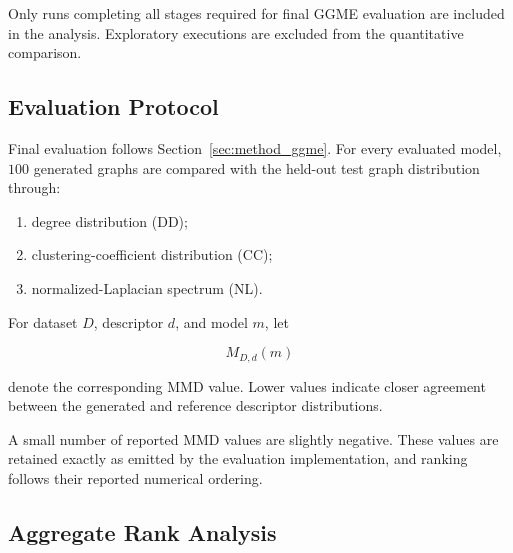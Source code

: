 Only runs completing all stages required for final GGME evaluation are included in the analysis. Exploratory executions are excluded from the quantitative comparison.




\subsection{Evaluation Protocol}
\label{subsec:exp_evaluation}

Final evaluation follows Section~\ref{sec:method_ggme}. For every evaluated model, \(100\) generated graphs are compared with the held-out test graph distribution through:

\begin{enumerate}
    \item degree distribution (DD);
    \item clustering-coefficient distribution (CC);
    \item normalized-Laplacian spectrum (NL).
\end{enumerate}

For dataset \(D\), descriptor \(d\), and model \(m\), let

\[
M_{D,d}(m)
\]

denote the corresponding MMD value. Lower values indicate closer agreement between the generated and reference descriptor distributions.

A small number of reported MMD values are slightly negative. These values are retained exactly as emitted by the evaluation implementation, and ranking follows their reported numerical ordering.


\subsection{Aggregate Rank Analysis}
\label{subsec:exp_rank_method}


